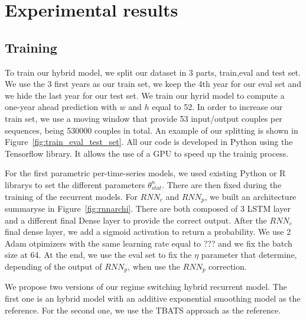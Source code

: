 \documentclass{article} %
\newcommand{\statparam}{\theta_{stat}}
\newcommand{\lag}{h}
\newcommand{\window}{w}
\newcommand{\threshold}{\eta}
\newcommand{\predictor}{RNN_p}
\newcommand{\classifier}{RNN_c}
\begin{document}
\section{Experimental results}
\label{sec:exp}

\subsection{Training}

To train our hybrid model, we split our dataset in 3 parts, train,eval and test set. We use the 3 first years as our train set, we keep the 4th year for our eval set and we hide the last year for our test set. We train our hyrid model to compute a one-year ahead prediction with $\window$ and $\lag$ equal to 52. In order to increase our train set, we use a moving window that provide 53 input/output couples per sequences, being 530000 couples in total. An example of our splitting is shown in  Figure~\ref{fig:train_eval_test_set}. All our code is developed in Python using the Tensorflow library. It allows the use of a GPU to speed up the trainig process.

For the first parametric per-time-series models, we used existing Python or R librarys to set the different parameters $\statparam^n$. There are then fixed during the training of the recurrent models.
For $\classifier$ and $\predictor$, we built an architecture summaryse in Figure~\ref{fig:rnnarchi}. There are both composed of 3 LSTM layer and a different final Dense layer to provide the correct output. After the $\classifier$ final dense layer, we add a sigmoid activation to return a probability. We use 2 Adam otpimizers with the same learning rate equal to ??? and we fix the batch size at 64. At the end, we use the eval set to fix the $\threshold$ parameter that determine, depending of the output of $\predictor$, when use the $\predictor$ correction. 

We propose two versions of our regime switching hybrid recurrent model. The first one is an hybrid model with an additive exponential smoothing model as the reference. For the second one, we use the TBATS approach as the reference.
\end{document}
